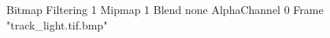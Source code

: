 {Bitmap
	{Filtering 1}
	{Mipmap 1}
	{Blend none}
	{AlphaChannel 0}
	{Frame "track_light.tif.bmp"}
}
